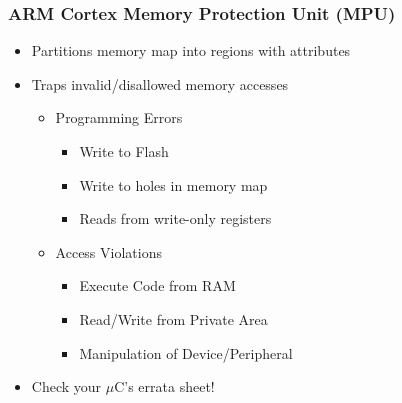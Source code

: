 \subsubsection{ARM Cortex Memory Protection Unit (MPU)}
\begin{itemize}
  \item Partitions memory map into regions with attributes
  \item Traps invalid/disallowed memory accesses
        \begin{itemize}
          \item Programming Errors
                \begin{itemize}
                  \item Write to Flash
                  \item Write to holes in memory map
                  \item Reads from write-only registers
                \end{itemize}
          \item Access Violations
                \begin{itemize}
                  \item Execute Code from RAM
                  \item Read/Write from Private Area
                  \item Manipulation of Device/Peripheral
                \end{itemize}
        \end{itemize}
  \item Check your $\mu$C's errata sheet!
\end{itemize}

